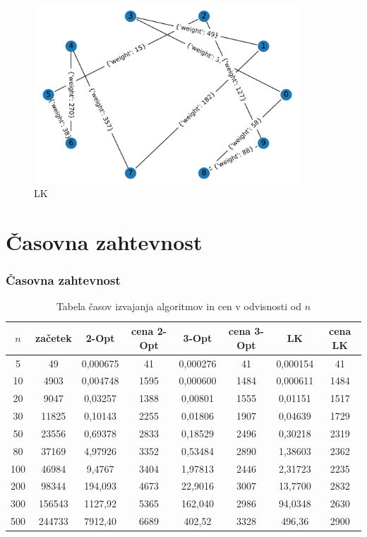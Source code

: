 \documentclass[8pt]{beamer}
\begin{document}
\begin{frame}
\begin{figure}
  \includegraphics[width=10cm]{primeri/primer2_lk.png}
\caption{LK}
\label{Slika 8}
\end{figure}
\end{frame}


\section[Časovna zahtevnost]{Časovna zahtevnost}
\begin{frame}
\frametitle{Časovna zahtevnost}
\begin{table}[!h]
\begin{tabular}{|c|c|c|c|c|c|c|c|}
\hline
$n$&začetek&2-Opt&cena 2-Opt&3-Opt&cena 3-Opt&LK&cena LK\\\hline
5&49&0,000675&41&0,000276&41&0,000154&41\\\hline
10&4903&0,004748&1595&0,000600&1484&0,000611&1484\\\hline
20&9047&0,03257&1388&0,00801&1555&0,01151&1517\\\hline
30&11825&0,10143&2255&0,01806&1907&0,04639&1729\\\hline
50&23556&0,69378&2833&0,18529&2496&0,30218&2319\\\hline
80&37169&4,97926&3352&0,53484&2890&1,38603&2362\\\hline
100&46984&9,4767&3404&1,97813&2446&2,31723&2235\\\hline
200&98344&194,093&4673&22,9016&3007&13,7700&2832\\\hline
300&156543&1127,92&5365&162,040&2986&94,0348&2630\\\hline
500&244733&7912,40&6689&402,52&3328&496,36&2900\\\hline
\end{tabular}
\caption{Tabela časov izvajanja algoritmov in cen v odvisnosti od $n$}
\label{tabela_casov}
\end{table}
\end{frame}
\end{document}
